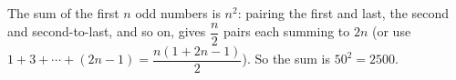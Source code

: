 The sum of the first $n$ odd numbers is $n^2$: pairing the first and last, the second and second-to-last, and so on, gives $\dfrac n2$ pairs each summing to $2n$ (or use $1+3+\cdots+(2n-1)=\dfrac{n(1+2n-1)}{2}$). So the sum is $50^2=\boxed{2500}$.
